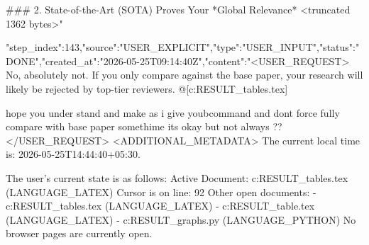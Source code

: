\begin{table}[t]
{\begin{table}[t]
{{{{{{{{{{{{### 2. State-of-the-Art (SOTA) Proves Your *Global Relevance*
<truncated 1362 bytes>"}
{"step_index":143,"source":"USER_EXPLICIT","type":"USER_INPUT","status":"DONE","created_at":"2026-05-25T09:14:40Z","content":"<USER_REQUEST>
No, absolutely not. If you only compare against the base paper, your research will likely be rejected by top-tier reviewers. @[c:\Users\ASUS\OneDrive\Desktop\BTP\Final RESULT\additional_tables.tex] 


hope you under stand and make as i give youbcommand and dont force fully compare with base paper somethime its okay but not always ??
</USER_REQUEST>
<ADDITIONAL_METADATA>
The current local time is: 2026-05-25T14:44:40+05:30.

The user's current state is as follows:
Active Document: c:\Users\ASUS\OneDrive\Desktop\BTP\Final RESULT\additional_tables.tex (LANGUAGE_LATEX)
Cursor is on line: 92
Other open documents:
- c:\Users\ASUS\OneDrive\Desktop\BTP\Final RESULT\additional_tables.tex (LANGUAGE_LATEX)
- c:\Users\ASUS\OneDrive\Desktop\BTP\Final RESULT\comparison_table.tex (LANGUAGE_LATEX)
- c:\Users\ASUS\OneDrive\Desktop\BTP\Final RESULT\generate_graphs.py (LANGUAGE_PYTHON)
No browser pages are currently open.

}}}}}}}}}}}}
\end{table}}
\end{table}
